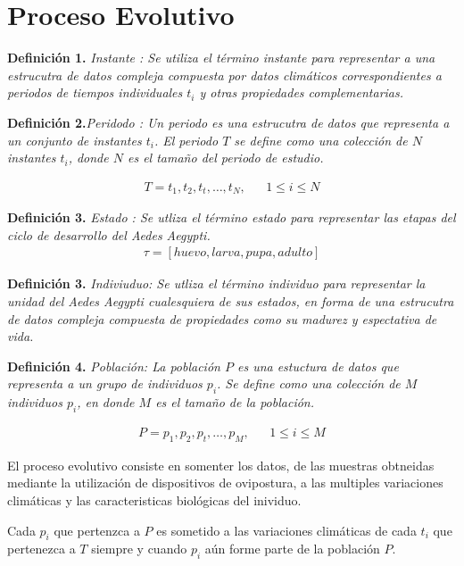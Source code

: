 \section{Proceso Evolutivo}


\textbf{Definición 1.} \em Instante \em : Se utiliza el término instante
    para representar a una estrucutra de datos compleja compuesta por
    datos climáticos correspondientes a periodos de tiempos individuales
    $t_{i}$ y otras propiedades complementarias.


\textbf{Definición 2.}\em Peridodo \em : Un periodo es una estrucutra de
    datos que representa a un conjunto de instantes $t_{i}$. El periodo
    $T$  se define como una colección de $N$ instantes
    $t_{i}$, donde $N$ es el tamaño del periodo de estudio.

    \begin{align*}
        T = t_1,t_2,t_t,\ldots,t_N , & & 1 \leq i \leq N
    \end{align*}


\textbf{Definición 3.} \em Estado \em : Se utliza el término estado
    para representar las etapas del ciclo de desarrollo del \em Aedes Aegypti\em.
    \begin{align*}
        \tau = [huevo, larva, pupa, adulto]
    \end{align*}

\textbf{Definición 3.} \em Indiviuduo\em : Se utliza el término individuo
    para representar la unidad del \em Aedes Aegypti \em cualesquiera de sus
    estados, en forma de una estrucutra de datos compleja compuesta de
    propiedades como su madurez y espectativa de vida.

\textbf{Definición 4.} \em Población\em : La población $P$ es una estuctura
    de datos que representa a un grupo de individuos $p_{i}$. Se define como
    una colección de $M$ individuos $p_{i}$, en donde $M$ es el tamaño de
    la población.

    \begin{align*}
        P = p_1,p_2,p_t,\ldots,p_M,  & & 1 \leq i \leq M
    \end{align*}


El proceso evolutivo consiste en somenter los datos, de las muestras obtneidas
mediante la utilización de dispositivos de ovipostura, a las multiples
variaciones climáticas y las caracteristicas biológicas del inividuo.

Cada $p_{i}$ que pertenzca a $P$ es sometido a las variaciones climáticas de
cada $t_{i}$ que pertenezca a $T$ siempre y cuando $p_{i}$ aún forme parte
de la población $P$.

